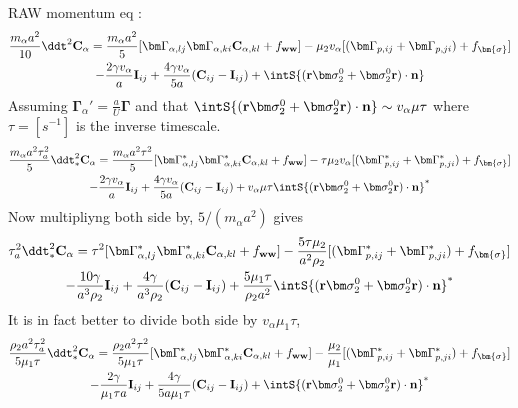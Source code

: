 RAW momentum eq :
\begin{multline}    
    \frac{m_\alpha a^2}{10}\ddt^2 \textbf{C}_\alpha
    =  \frac{m_\alpha a^2}{5}[
    \bm\Gamma_{\alpha,lj}\bm\Gamma_{\alpha,ki} \textbf{C}_{\alpha,kl} + f_\textbf{ww}]
    - \mu_2 v_\alpha [(\bm \Gamma_{p,ij}+\bm \Gamma_{p,ji})
    + f_{\bm{\sigma}}]\\
        - \frac{2 \gamma v_\alpha }{a} \textbf{I}_{ij} 
        + \frac{4 \gamma v_\alpha }{5 a} (\textbf{C}_{ij} - \textbf{I}_{ij})
        + \intS{(\textbf{r}\bm\sigma_2^0+ \bm\sigma_2^0\textbf{r})\cdot \textbf{n}}
\end{multline}
Assuming $\bm\Gamma_\alpha'  = \frac{a}{U}\bm\Gamma$ and that  $\intS{(\textbf{r}\bm\sigma_2^0+ \bm\sigma_2^0\textbf{r})\cdot \textbf{n}} \sim v_\alpha \mu \tau$ where $\tau = [s^{-1}]$ is the inverse timescale.  
\begin{multline}    
    \frac{m_\alpha a^2 \tau_a^2}{5}\ddt^2_* \textbf{C}_\alpha
    =  \frac{m_\alpha a^2 \tau^2}{5}[
    \bm\Gamma_{\alpha,lj}^* \bm\Gamma_{\alpha,ki}^* \textbf{C}_{\alpha,kl} + f_\textbf{ww}]
    - \tau \mu_2 v_\alpha [(\bm \Gamma_{p,ij}^*+\bm \Gamma_{p,ji}^*)
    + f_{\bm{\sigma}}]\\
        - \frac{2 \gamma v_\alpha }{a} \textbf{I}_{ij} 
        + \frac{4 \gamma v_\alpha }{5 a} (\textbf{C}_{ij} - \textbf{I}_{ij})
        + v_\alpha \mu \tau\intS{(\textbf{r}\bm\sigma_2^0+ \bm\sigma_2^0\textbf{r})\cdot \textbf{n}}^*
\end{multline}
Now multipliyng both side by, $5/(m_\alpha a^2)$ gives
\begin{multline}    
    \tau_a^2 \ddt^2_* \textbf{C}_\alpha
    =  \tau^2[
    \bm\Gamma_{\alpha,lj}^* \bm\Gamma_{\alpha,ki}^* \textbf{C}_{\alpha,kl} + f_\textbf{ww}]
    - \frac{5 \tau \mu_2}{a^2 \rho_2} [(\bm \Gamma_{p,ij}^*+\bm \Gamma_{p,ji}^*)
    + f_{\bm{\sigma}}]\\
        - \frac{10 \gamma }{a^3\rho_2} \textbf{I}_{ij} 
        + \frac{4 \gamma }{a^3 \rho_2} (\textbf{C}_{ij} - \textbf{I}_{ij})
        + \frac{5  \mu_1 \tau}{\rho_2a^2} 
        \intS{(\textbf{r}\bm\sigma_2^0+ \bm\sigma_2^0\textbf{r})\cdot \textbf{n}}^*
\end{multline}
It is in fact better to divide both side by $v_\alpha \mu_1 \tau$, 
\begin{multline}    
    \frac{\rho_2 a^2 \tau_a^2}{5\mu_1 \tau}\ddt^2_* \textbf{C}_\alpha
    =  \frac{\rho_2 a^2 \tau^2}{5 \mu_1 \tau}[
    \bm\Gamma_{\alpha,lj}^* \bm\Gamma_{\alpha,ki}^* \textbf{C}_{\alpha,kl} + f_\textbf{ww}]
    - \frac{\mu_2}{\mu_1}  [(\bm \Gamma_{p,ij}^*+\bm \Gamma_{p,ji}^*)
    + f_{\bm{\sigma}}]\\
        - \frac{2 \gamma }{\mu_1 \tau a} \textbf{I}_{ij} 
        + \frac{4 \gamma }{5 a \mu_1 \tau} (\textbf{C}_{ij} - \textbf{I}_{ij})
        + \intS{(\textbf{r}\bm\sigma_2^0+ \bm\sigma_2^0\textbf{r})\cdot \textbf{n}}^*
\end{multline}
